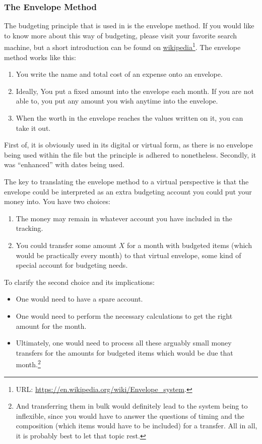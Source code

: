 \subsubsection{The Envelope Method}
\label{subsubsec:budgeting-the-envelope-method}

The budgeting principle that is used in \tfn is the envelope method.
If you would like to know more about this way of budgeting, please visit your favorite search machine, but a short introduction can be found on \href{https://en.wikipedia.org/wiki/Envelope_system}{wikipedia}\footnote{URL: \href{https://en.wikipedia.org/wiki/Envelope_system}{https://en.wikipedia.org/wiki/Envelope{\_}system}.}.
The envelope method works like this:
\begin{enumerate}
	\item You write the name and total cost of an expense onto an envelope.
	\item Ideally, You put a fixed amount into the envelope each month.
	If you are not able to, you put any amount you wish anytime into the envelope.
	\item When the worth in the envelope reaches the values written on it, you can take it out.
\end{enumerate}
First of, it is obviously used in its digital or virtual form, as there is no envelope being used within the file but the principle is adhered to nonetheless.
Secondly, it was ``enhanced'' with dates being used.

The key to translating the envelope method to a virtual perspective is that the envelope could be interpreted as an extra budgeting account you could put your money into.
You have two choices:
\begin{enumerate}
	\item The money may remain in whatever account you have included in the tracking.
	\item You could transfer some amount \( X \) for a month with budgeted items (which would be practically every month) to that virtual envelope, \ie some kind of special account for budgeting needs.
\end{enumerate}

To clarify the second choice and its implications:
\begin{itemize}
	\item One would need to have a spare account.
	\item One would need to perform the necessary calculations to get the right amount for the month.
	\item Ultimately, one would need to process all these arguably small money transfers for the amounts for budgeted items which would be due that month.\footnote{And transferring them in bulk would definitely lead to the system being to inflexible, since you would have to answer the questions of timing and the composition (which items would have to be included) for a transfer.
	All in all, it is probably best to let that topic rest.}
\end{itemize}

